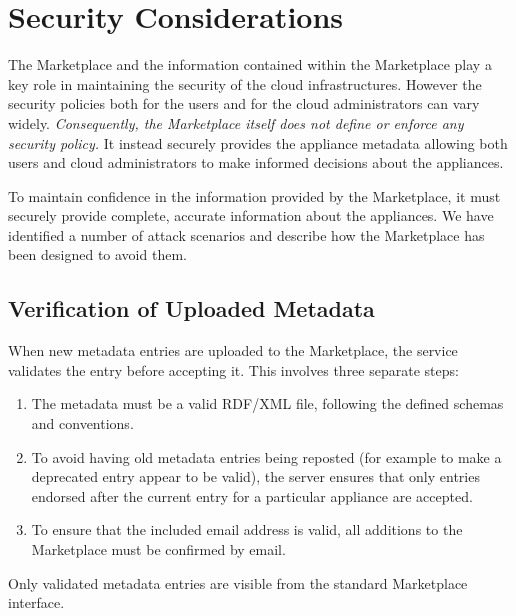 \section{Security Considerations}
\label{sec:security}

The Marketplace and the information contained within the Marketplace
play a key role in maintaining the security of the cloud
infrastructures.  However the security policies both for the users and
for the cloud administrators can vary widely.  {\em Consequently, the
  Marketplace itself does not define or enforce any security policy.}
It instead securely provides the appliance metadata allowing both
users and cloud administrators to make informed decisions about the
appliances.


To maintain confidence in the information provided by the Marketplace,
it must securely provide complete, accurate information about the
appliances.  We have identified a number of attack scenarios and
describe how the Marketplace has been designed to avoid them. 

\subsection{Verification of Uploaded Metadata}

When new metadata entries are uploaded to the Marketplace, the service
validates the entry before accepting it.  This involves three
separate steps:
\begin{enumerate}
\item The metadata must be a valid RDF/XML file, following the defined
  schemas and conventions.
\item To avoid having old metadata entries being reposted (for example
  to make a deprecated entry appear to be valid), the server
  ensures that only entries endorsed after the current entry for a particular
  appliance are accepted.
\item To ensure that the included email address is valid, all
  additions to the Marketplace must be confirmed by email.
\end{enumerate}
Only validated metadata entries are visible from the standard
Marketplace interface. 

